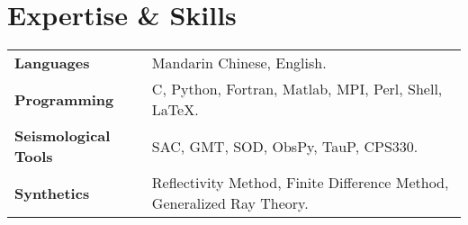 \section*{Expertise \& Skills}

\begin{tabular}{p{} p{}}
\textbf{Languages} & Mandarin Chinese, English. \\
\textbf{Programming} & C, Python, Fortran, Matlab, MPI, Perl, Shell, LaTeX. \\
\textbf{Seismological Tools} & SAC, GMT, SOD, ObsPy, TauP, CPS330. \\
\textbf{Synthetics} & Reflectivity Method, Finite Difference Method, Generalized Ray Theory.\\
\end{tabular}
